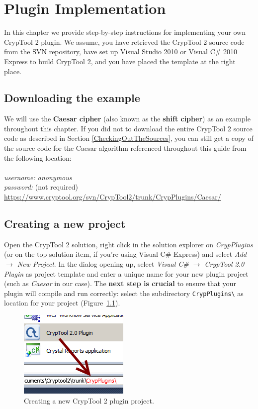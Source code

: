 \chapter{Plugin Implementation}
\label{sec:PluginImplementation}
In this chapter we provide step-by-step instructions for implementing your own CrypTool 2 plugin. We assume, you have retrieved the CrypTool 2 source code from the SVN repository, have set up Visual Studio 2010 or Visual C\# 2010 Express to build CrypTool 2, and you have placed the template at the right place.

\section{Downloading the example}
\label{sec:DownloadingTheExample}

We will use the \textbf{Caesar cipher} (also known as the \textbf{shift cipher}) as an example throughout this chapter. If you did not to download the entire CrypTool 2 source code as described in Section \ref{CheckingOutTheSources}, you can still get a copy of the source code for the Caesar algorithm referenced throughout this guide from the following location:\\\\
\textit{username: anonymous\\
password:} (not required)\\
\url{https://www.cryptool.org/svn/CrypTool2/trunk/CrypPlugins/Caesar/}

\section{Creating a new project}
\label{sec:CreatingANewProject}

Open the CrypTool 2 solution, right click in the solution explorer on \textit{CrypPlugins} (or on the top solution item, if you're using Visual C\# Express) and select \textit{Add~$\rightarrow$ New Project}. In the dialog opening up, select \textit{Visual C\# $\rightarrow$ CrypTool 2.0 Plugin} as project template and enter a unique name for your new plugin project (such as \textit{Caesar} in our case). The \textbf{next step is crucial} to ensure that your plugin will compile and run correctly: select the subdirectory \texttt{CrypPlugins\textbackslash} as location for your project (Figure~\ref{fig:vs_create_new_project}).

\begin{figure}
	\centering
		\includegraphics{figures/vs_create_new_project.png}
	\caption{Creating a new CrypTool 2 plugin project.}
	\label{fig:vs_create_new_project}
\end{figure}

